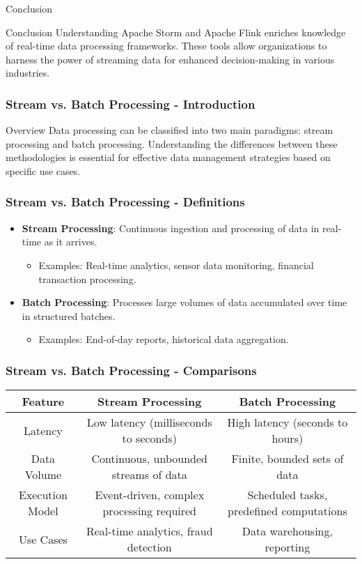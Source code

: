 \documentclass[aspectratio=169]{beamer}
\begin{document}
\begin{frame}{Conclusion}
    \begin{block}{Conclusion}
        Understanding Apache Storm and Apache Flink enriches knowledge of real-time data processing frameworks. These tools allow organizations to harness the power of streaming data for enhanced decision-making in various industries.
    \end{block}
\end{frame}

\begin{frame}[fragile]
    \frametitle{Stream vs. Batch Processing - Introduction}
    \begin{block}{Overview}
        Data processing can be classified into two main paradigms:
        stream processing and batch processing. 
        Understanding the differences between these methodologies is essential for effective data management strategies based on specific use cases.
    \end{block}
\end{frame}

\begin{frame}[fragile]
    \frametitle{Stream vs. Batch Processing - Definitions}
    \begin{itemize}
        \item \textbf{Stream Processing}: Continuous ingestion and processing of data in real-time as it arrives. 
        \begin{itemize}
            \item Examples: Real-time analytics, sensor data monitoring, financial transaction processing.
        \end{itemize}
        \item \textbf{Batch Processing}: Processes large volumes of data accumulated over time in structured batches.
        \begin{itemize}
            \item Examples: End-of-day reports, historical data aggregation.
        \end{itemize}
    \end{itemize}
\end{frame}

\begin{frame}[fragile]
    \frametitle{Stream vs. Batch Processing - Comparisons}
    \begin{tabular}{|c|c|c|}
        \hline
        \textbf{Feature} & \textbf{Stream Processing} & \textbf{Batch Processing} \\
        \hline
        Latency & Low latency (milliseconds to seconds) & High latency (seconds to hours) \\
        \hline
        Data Volume & Continuous, unbounded streams of data & Finite, bounded sets of data \\
        \hline
        Execution Model & Event-driven, complex processing required & Scheduled tasks, predefined computations \\
        \hline
        Use Cases & Real-time analytics, fraud detection & Data warehousing, reporting \\
        \hline
    \end{tabular}
\end{frame}
\end{document}
